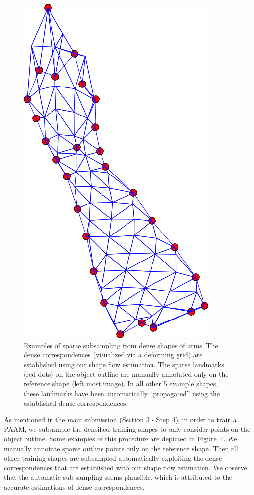\begin{figure}[!b]
    \includegraphics[height=\ofh]{Suplementory_Meterial/SparseSamples/mean-4.png}
\caption{Examples of sparse subsampling from dense shapes of arms. The dense correspondences (visualized via a deforming grid) are established using our shape flow estimation. The sparse landmarks (red dots) on the object outline are manually annotated only on the reference shape (left most image). In all other 5 example shapes, these landmarks have been automatically ``propagated'' using the established dense correspondences.}
\label{fig:sparsesample}
\end{figure}

As mentioned in the main submission (Section 3 - Step 4), in order to train a PAAM, we subsample the  densified training shapes to only consider points on the object outline. 
Some examples of this procedure are depicted in Figure~\ref{fig:sparsesample}. 
We manually annotate sparse outline points only on the reference shape. Then all other training shapes are subsampled automatically exploiting the dense correspondences that are established with our shape flow estimation. We observe that the automatic sub-sampling seems plausible, which is attributed to the accurate estimations of dense correspondences.


